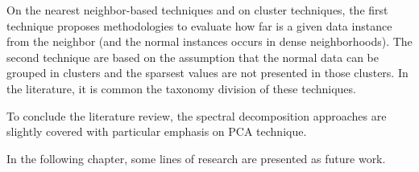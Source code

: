 On the nearest neighbor-based techniques and on cluster techniques, the first technique proposes methodologies to evaluate how far is a given data instance from the neighbor (and the normal instances occurs in dense neighborhoods). The second technique are based on the assumption that the normal data can be grouped in clusters and the sparsest values are not presented in those clusters. In the literature, it is common the taxonomy division of these techniques.

To conclude the literature review, the spectral decomposition approaches are slightly covered with particular emphasis on PCA technique.

In the following chapter, some lines of research are presented as future work.
